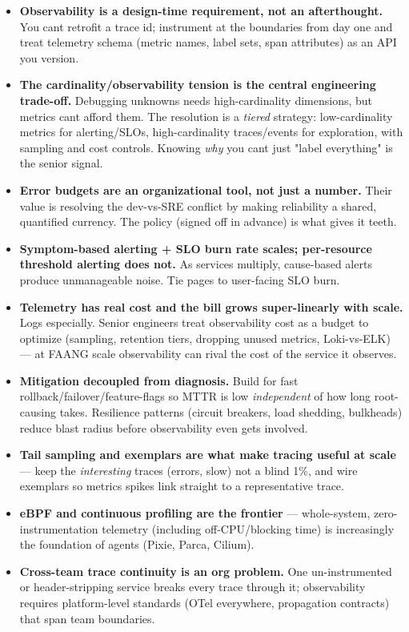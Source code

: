 \documentclass[11pt]{article}
\providecommand{\tightlist}{\setlength{\itemsep}{1pt}\setlength{\parskip}{0pt}}
\begin{document}
\begin{itemize}
\tightlist
\item
  \textbf{Observability is a design-time requirement, not an afterthought.} You can\textquotesingle t retrofit a trace id; instrument at the boundaries from day one and treat telemetry schema (metric names, label sets, span attributes) as an API you version.
\item
  \textbf{The cardinality/observability tension is the central engineering trade-off.} Debugging unknowns needs high-cardinality dimensions, but metrics can\textquotesingle t afford them. The resolution is a \emph{tiered} strategy: low-cardinality metrics for alerting/SLOs, high-cardinality traces/events for exploration, with sampling and cost controls. Knowing \emph{why} you can\textquotesingle t just "label everything" is the senior signal.
\item
  \textbf{Error budgets are an organizational tool, not just a number.} Their value is resolving the dev-vs-SRE conflict by making reliability a shared, quantified currency. The policy (signed off in advance) is what gives it teeth.
\item
  \textbf{Symptom-based alerting + SLO burn rate scales; per-resource threshold alerting does not.} As services multiply, cause-based alerts produce unmanageable noise. Tie pages to user-facing SLO burn.
\item
  \textbf{Telemetry has real cost and the bill grows super-linearly with scale.} Logs especially. Senior engineers treat observability cost as a budget to optimize (sampling, retention tiers, dropping unused metrics, Loki-vs-ELK) --- at FAANG scale observability can rival the cost of the service it observes.
\item
  \textbf{Mitigation decoupled from diagnosis.} Build for fast rollback/failover/feature-flags so MTTR is low \emph{independent} of how long root-causing takes. Resilience patterns (circuit breakers, load shedding, bulkheads) reduce blast radius before observability even gets involved.
\item
  \textbf{Tail sampling and exemplars are what make tracing useful at scale} --- keep the \emph{interesting} traces (errors, slow) not a blind 1\%, and wire exemplars so metrics spikes link straight to a representative trace.
\item
  \textbf{eBPF and continuous profiling are the frontier} --- whole-system, zero-instrumentation telemetry (including off-CPU/blocking time) is increasingly the foundation of agents (Pixie, Parca, Cilium).
\item
  \textbf{Cross-team trace continuity is an org problem.} One un-instrumented or header-stripping service breaks every trace through it; observability requires platform-level standards (OTel everywhere, propagation contracts) that span team boundaries.
\end{itemize}
\end{document}
